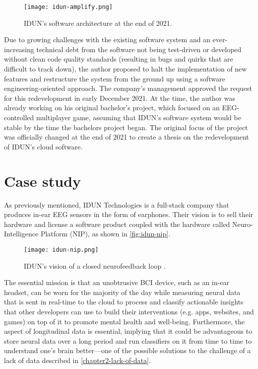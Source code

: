 \begin{figure}[!ht]
  \centering
  \texttt{[image: idun-amplify.png]}
  \caption{IDUN’s software architecture at the end of 2021.}
  \label{fig:idun-amplify}
\end{figure}

Due to growing challenges with the existing software system and an ever-increasing technical debt from the software not being test-driven or developed without clean code quality standards (resulting in bugs and quirks that are difficult to track down), the author proposed to halt the implementation of new features and restructure the system from the ground up using a software engineering-oriented approach. The company’s management approved the request for this redevelopment in early December 2021. At the time, the author was already working on his original bachelor’s project, which focused on an EEG-controlled multiplayer game, assuming that IDUN’s software system would be stable by the time the bachelors project began. The original focus of the project was officially changed at the end of 2021 to create a thesis on the redevelopment of IDUN’s cloud software.

\section{Case study}
\label{chapter3-case-study}

As previously mentioned, IDUN Technologies is a full-stack company that produces in-ear EEG sensors in the form of earphones. Their vision is to sell their hardware and license a software product coupled with the hardware called Neuro-Intelligence Platform (NIP), as shown in \autoref{fig:idun-nip}.

\begin{figure}[!ht]
  \centering
  \texttt{[image: idun-nip.png]}
  \caption[IDUN’s vision of a closed neurofeedback loop.]{IDUN’s vision of a closed neurofeedback loop \citep{idun_guardian_nodate}.}
  \label{fig:idun-nip}
\end{figure}

The essential mission is that an unobtrusive BCI device, such as an in-ear headset, can be worn for the majority of the day while measuring neural data that is sent in real-time to the cloud to process and classify actionable insights that other developers can use to build their interventions (e.g. apps, websites, and games) on top of it to promote mental health and well-being. Furthermore, the aspect of longitudinal data is essential, implying that it could be advantageous to store neural data over a long period and run classifiers on it from time to time to understand one’s brain better—one of the possible solutions to the challenge of a lack of data described in \autoref{chapter2-lack-of-data}.

